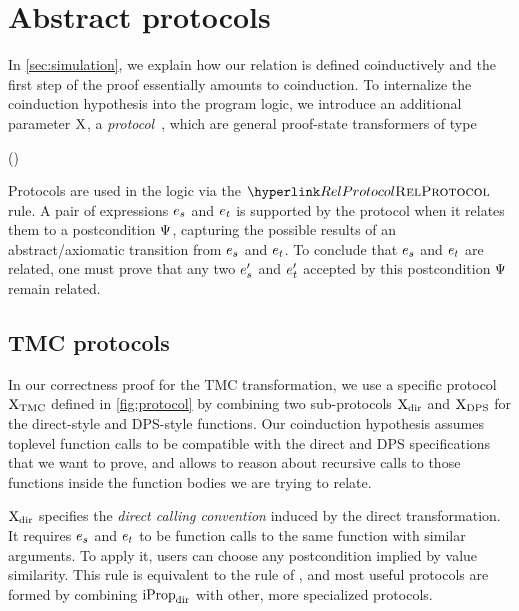 \section{Abstract protocols} \label{sec:protocols} \label{subsec:protocols}



In \cref{sec:simulation}, we explain how our relation is defined coinductively and the first step of the proof essentially amounts to coinduction.
To internalize the coinduction hypothesis into the program logic, we introduce an additional parameter $\mathrm{X}$, a \emph{protocol}~\citep*{protocols-2021}, which are general proof-state transformers of type
\begin{mathline}
(\datalangExpr[] \to \datalangExpr[] \to \iProp) \to \datalangExpr[] \to \datalangExpr[] \to \iProp
\end{mathline}

Protocols are used in the logic via the $\RefTirName{RelProtocol}$ rule.
A pair of expressions $\datalangExpr_s$ and $\datalangExpr_t$ is supported by the protocol when it relates them to a postcondition $\Psi$, capturing the possible results of an abstract/axiomatic transition from $\datalangExpr_s$ and $\datalangExpr_t$.
To conclude that $\datalangExpr_s$ and $\datalangExpr_t$ are related, one must prove that any two $\datalangExpr_s'$ and $\datalangExpr_t'$ accepted by this postcondition $\Psi$ remain related.

\subsection{TMC protocols}

In our correctness proof for the TMC transformation, we use a specific protocol $\mathrm{X}_\mathrm{TMC}$ defined in \cref{fig:protocol} by combining two sub-protocols $\mathrm{X}_\mathrm{dir}$ and $\mathrm{X}_\mathrm{DPS}$ for the direct-style and DPS-style functions. Our coinduction hypothesis assumes toplevel function calls to be compatible with the direct and DPS specifications that we want to prove, and allows to reason about recursive calls to those functions inside the function bodies we are trying to relate.

$\mathrm{X}_\mathrm{dir}$ specifies the \emph{direct calling convention} induced by the direct transformation.
It requires $\datalangExpr_s$ and $\datalangExpr_t$ to be function calls to the same function with similar arguments.
To apply it, users can choose any postcondition implied by value similarity.
This rule is equivalent to the  rule of \Simuliris, and most useful protocols are formed by combining $\mathrm{iProp}_\mathrm{dir}$ with other, more specialized protocols.

